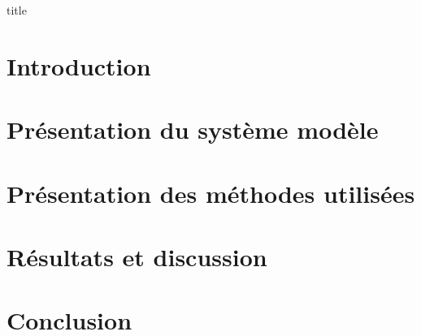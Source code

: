 \documentclass[a4paper, 11pt]{article}
\begin{document}
    {title}
\clearpage


\tableofcontents
\thispagestyle{empty}
\clearpage


\setcounter{page}{1}
\section*{Introduction}

    
\clearpage


\section{Présentation du système modèle}

    

\section{Présentation des méthodes utilisées}


\section{Résultats et discussion}


\section{Conclusion}


\printbibliography
\end{document}
